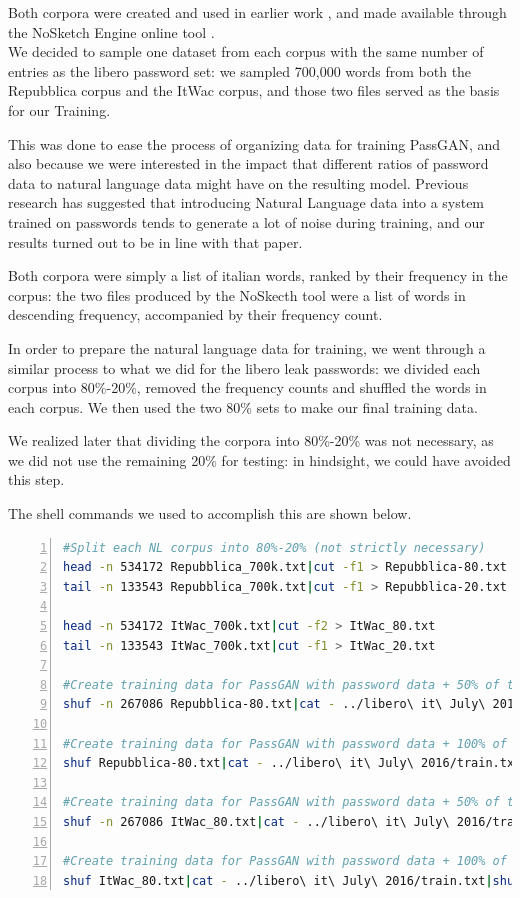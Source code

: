 Both corpora were created and used in earlier work \cite{baroni2004introducing,baroni2009wacky}, and made available through the NoSketch Engine online tool \cite{nosketch_engine}.\\
We decided to sample one dataset from each corpus with the same number of entries as the libero password set: we sampled 700,000 words from both the Repubblica corpus and the ItWac corpus, and those two files served as the basis for our Training. 

This was done to ease the process of organizing data for training PassGAN, and also because we were interested in the impact that different ratios of password data to natural language data might have on the resulting model.
Previous research \cite{Melicher2016} has suggested that introducing Natural Language data into a system trained on passwords tends to generate a lot of noise during training, and our results turned out to be in line with that paper.

Both corpora were simply a list of italian words, ranked by their frequency in the corpus: the two  files produced by the NoSkecth tool were a list of words in descending frequency, accompanied by their frequency count.

In order to prepare the natural language  data for training, we went through a similar process to what we did for the libero leak passwords: we divided each corpus into 80\%-20\%, removed the frequency counts and shuffled the words in each corpus. We then used the two 80\% sets to make our final training data.

We realized later that dividing the corpora into 80\%-20\% was not necessary, as we did not use the remaining 20\% for testing: in hindsight, we could have avoided this step.

The shell commands we used to accomplish this are shown below.
\clearpage
\begin{lstlisting}[language=bash,numbers=left,stepnumber=1,breaklines=true,postbreak=\mbox{\textcolor{red}{$\hookrightarrow$}\space}]
#Split each NL corpus into 80%-20% (not strictly necessary)
head -n 534172 Repubblica_700k.txt|cut -f1 > Repubblica-80.txt
tail -n 133543 Repubblica_700k.txt|cut -f1 > Repubblica-20.txt

head -n 534172 ItWac_700k.txt|cut -f2 > ItWac_80.txt
tail -n 133543 ItWac_700k.txt|cut -f1 > ItWac_20.txt

#Create training data for PassGAN with password data + 50% of the Repubblica corpus
shuf -n 267086 Repubblica-80.txt|cat - ../libero\ it\ July\ 2016/train.txt|shuf > libero+Repubblica-50.txt

#Create training data for PassGAN with password data + 100% of the repubblica corpus
shuf Repubblica-80.txt|cat - ../libero\ it\ July\ 2016/train.txt|shuf > libero+Repubblica.txt

#Create training data for PassGAN with password data + 50% of the ItWaC corpus
shuf -n 267086 ItWac_80.txt|cat - ../libero\ it\ July\ 2016/train.txt|shuf > libero+ItWac-50.txt

#Create training data for PassGAN with password data + 100% of the ItwaC corpus
shuf ItWac_80.txt|cat - ../libero\ it\ July\ 2016/train.txt|shuf > libero+ItWac.txt
\end{lstlisting}

